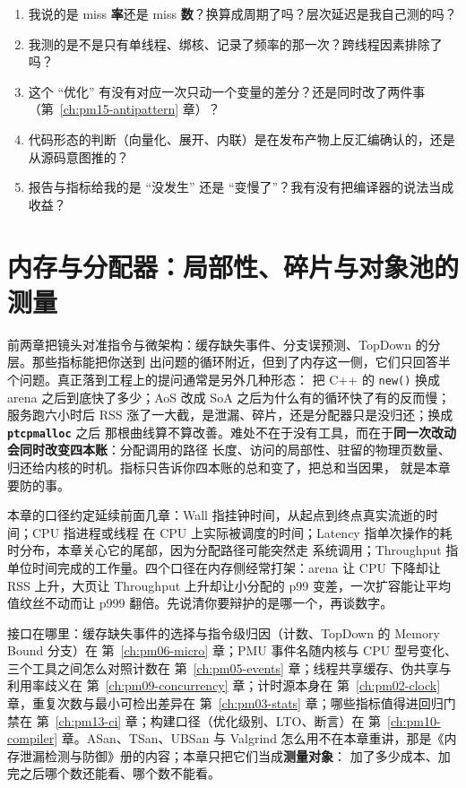\documentclass[12pt,a4paper,fontset=fandol]{ctexbook}
\newcommand{\Fn}[1]{\texttt{#1()}}
\newcommand{\Lib}[1]{\textbf{\texttt{#1}}}
\newcommand{\Lang}[1]{\textsf{#1}}
\newcommand{\CPP}{\Lang{C++}}
\newcommand{\MWall}{\Lang{Wall}}
\newcommand{\MCpu}{\Lang{CPU}}
\newcommand{\MLat}{\Lang{Latency}}
\newcommand{\MThr}{\Lang{Throughput}}
\newcommand{\Mx}[1]{\textsf{#1}}
\begin{document}
\begin{enumerate}
\item 我说的是 miss \textbf{率}还是 miss \textbf{数}？换算成周期了吗？层次延迟是我自己测的吗？
\item 我测的是不是只有单线程、绑核、记录了频率的那一次？跨线程因素排除了吗？
\item 这个 ``优化'' 有没有对应一次只动一个变量的差分？还是同时改了两件事（第~\ref{ch:pm15-antipattern} 章）？
\item 代码形态的判断（向量化、展开、内联）是在发布产物上反汇编确认的，还是从源码意图推的？
\item 报告与指标给我的是 ``没发生'' 还是 ``变慢了''？我有没有把编译器的说法当成收益？
\end{enumerate}

\chapter{内存与分配器：局部性、碎片与对象池的测量}
\label{ch:pm07-memory}

前两章把镜头对准指令与微架构：缓存缺失事件、分支误预测、\Mx{TopDown} 的分层。那些指标能把你送到
出问题的循环附近，但到了内存这一侧，它们只回答半个问题。真正落到工程上的提问通常是另外几种形态：
把 \CPP{} 的 \Fn{new} 换成 arena 之后到底快了多少；AoS 改成 SoA 之后为什么有的循环快了有的反而慢；
服务跑六小时后 \Mx{RSS} 涨了一大截，是泄漏、碎片，还是分配器只是没归还；换成 \Lib{ptcpmalloc} 之后
那根曲线算不算改善。难处不在于没有工具，而在于\textbf{同一次改动会同时改变四本账}：分配调用的路径
长度、访问的局部性、驻留的物理页数量、归还给内核的时机。指标只告诉你四本账的总和变了，把总和当因果，
就是本章要防的事。

本章的口径约定延续前面几章：\MWall{} 指挂钟时间，从起点到终点真实流逝的时间；\MCpu{} 指进程或线程
在 CPU 上实际被调度的时间；\MLat{} 指单次操作的耗时分布，本章关心它的尾部，因为分配路径可能突然走
系统调用；\MThr{} 指单位时间完成的工作量。四个口径在内存侧经常打架：arena 让 \MCpu{} 下降却让
\Mx{RSS} 上升，大页让 \MThr{} 上升却让小分配的 \Mx{p99} 变差，一次扩容能让平均值纹丝不动而让
\Mx{p999} 翻倍。先说清你要辩护的是哪一个，再谈数字。

接口在哪里：缓存缺失事件的选择与指令级归因（计数、\Mx{TopDown} 的 \Mx{Memory Bound} 分支）在
第~\ref{ch:pm06-micro} 章；PMU 事件名随内核与 CPU 型号变化、三个工具之间怎么对照计数在
第~\ref{ch:pm05-events} 章；线程共享缓存、伪共享与利用率歧义在 第~\ref{ch:pm09-concurrency} 章；计时源本身在
第~\ref{ch:pm02-clock} 章，重复次数与最小可检出差异在 第~\ref{ch:pm03-stats} 章；哪些指标值得进回归门禁在
第~\ref{ch:pm13-ci} 章；构建口径（优化级别、LTO、断言）在 第~\ref{ch:pm10-compiler} 章。ASan、TSan、UBSan 与
Valgrind 怎么用不在本章重讲，那是《内存泄漏检测与防御》册的内容；本章只把它们当成\textbf{测量对象}：
加了多少成本、加完之后哪个数还能看、哪个数不能看。
\end{document}
